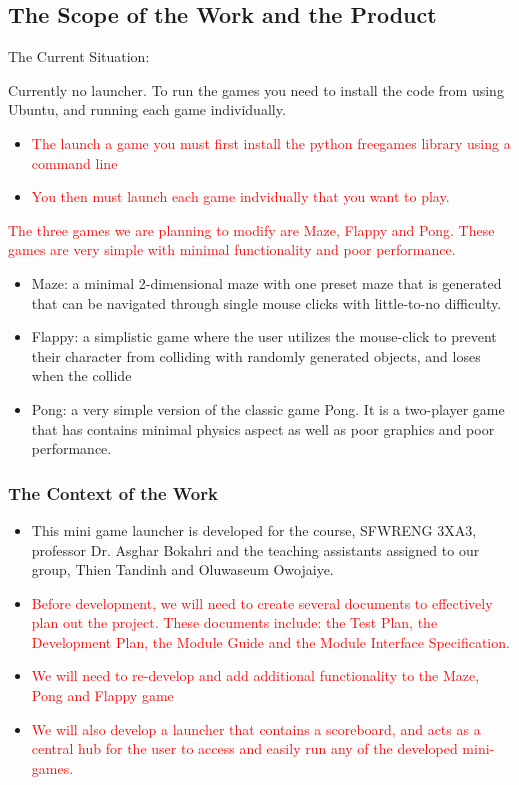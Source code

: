\documentclass[12pt, titlepage]{article}
\begin{document}
\subsection{The Scope of the Work and the Product}

The Current Situation:

Currently no launcher. To run the games you need to install the code from using Ubuntu, and running each game individually.
\begin{itemize}
    \item \textcolor{red}{The launch a game you must first install the python freegames library using a command line}
    \item \textcolor{red}{You then must launch each game indvidually that you want to play.}
\end{itemize}

\textcolor{red}{The three games we are planning to modify are Maze, Flappy and Pong. These games are very simple with minimal functionality and poor performance.}
\begin{itemize}
    \item Maze: a minimal 2-dimensional maze with one preset maze that is generated that can be navigated through single mouse clicks with little-to-no difficulty.
    \item Flappy: a simplistic game where the user utilizes the mouse-click to prevent their character from colliding with randomly generated objects, and loses when the collide
    \item Pong: a very simple version of the classic game Pong. It is a two-player game that has contains minimal physics aspect as well as poor graphics and poor performance.
\end{itemize}

\subsubsection{The Context of the Work}
\begin{itemize}
    \item This mini game launcher is developed for the course, SFWRENG 3XA3, professor Dr. Asghar Bokahri and the teaching assistants assigned to our group, Thien Tandinh and Oluwaseum Owojaiye.
    \item \textcolor{red}{Before development, we will need to create several documents to effectively plan out the project. These documents include: the Test Plan, the Development Plan, the Module Guide and the Module Interface Specification.}
    \item \textcolor{red}{We will need to re-develop and add additional functionality to the Maze, Pong and Flappy game}
    \item \textcolor{red}{We will also develop a launcher that contains a scoreboard, and acts as a central hub for the user to access and easily run any of the developed mini-games.}
\end{itemize}
\end{document}
